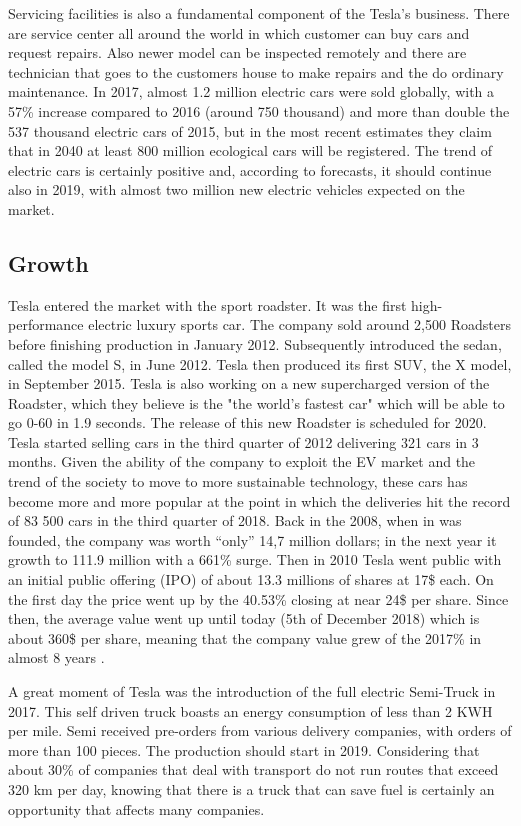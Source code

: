 Servicing facilities is also a fundamental component of the Tesla’s business. There are service center all around the world in which customer can buy cars and request repairs. Also newer model can be inspected remotely and there are technician that goes to the customers house to make repairs and the do ordinary maintenance.
In 2017, almost 1.2 million electric cars were sold globally, with a 57\% increase compared to 2016 (around 750 thousand) and more than double the 537 thousand electric cars of 2015, but in the most recent estimates they claim that in 2040 at least 800 million ecological cars will be registered. The trend of electric cars is certainly positive and, according to forecasts, it should continue also in 2019, with almost two million new electric vehicles expected on the market.



\subsection{Growth}
Tesla entered the market with the sport roadster. It was the first high-performance electric luxury sports car. The company sold around 2,500 Roadsters before finishing production in January 2012.
Subsequently introduced the sedan, called the model S, in June 2012. Tesla then produced its first SUV, the X model, in September 2015. Tesla is also working on a new supercharged version of the Roadster, which they believe is the "the world's fastest car" which will be able to go 0-60 in 1.9 seconds. The release of this new Roadster is scheduled for 2020.
Tesla started selling cars in the third quarter of 2012 delivering 321 cars in 3 months. Given the ability of the company to exploit the EV market and the trend of the society to move to more sustainable technology, these cars has become more and more popular at the point in which the deliveries hit the record of 83 500 cars in the third quarter of 2018.
Back in the 2008, when in was founded, the company was worth “only” 14,7 million dollars; in the next year it growth to 111.9 million with a 661\% surge. Then in 2010 Tesla went public with an initial public offering (IPO) of about 13.3 millions of shares at 17\$ each. On the first day the price went up by the 40.53\% closing at near 24\$ per share. Since then, the average value went up until today (5th of December 2018) which is about 360\$ per share, meaning that the company value grew of the 2017\% in almost 8 years \cite{Growth}.

A great moment of Tesla was the introduction of the full electric Semi-Truck in 2017. This self driven truck boasts an energy consumption of less than 2 KWH per mile. Semi received pre-orders from various delivery companies, with orders of more than 100 pieces. The production should start in 2019. Considering that about 30\% of companies that deal with transport do not run routes that exceed 320 km per day, knowing that there is a truck that can save fuel is certainly an opportunity that affects many companies.

